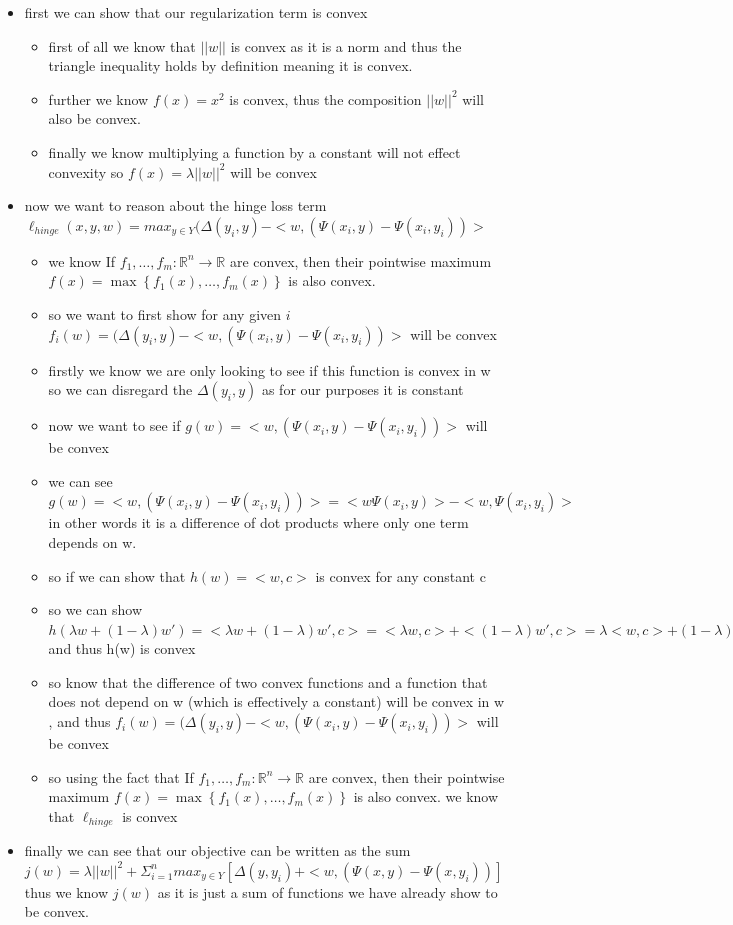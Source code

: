 \documentclass{article}
\theoremstyle{plain}
\theoremstyle{definition}
\begin{document}
\begin{enumerate}
\begin{itemize}
   \color{blue}
    \item first we can show that our regularization term is convex 
    \begin{itemize}
    \item first of all we know that $||w||$ is convex as it is a norm and thus the triangle inequality holds by definition meaning it is convex.
    \item further we know $f(x)=x^2$ is convex, thus the composition $||w||^2$ will also be convex. 
    \item finally we know multiplying a function by a constant will not effect convexity so $f(x)=\lambda||w||^2$ will be convex
    \end{itemize}
    \item now we want to reason about the hinge loss term $\ell_{hinge}(x,y,w)=max_{y\in Y}(\Delta(y_i,y)-<w,(\Psi(x_i,y)- \Psi(x_i,y_i))>$
    \begin{itemize}
        \item we know If $f_{1},\ldots,f_{m}:\mathbb{R}^{n}\to\mathbb{R}$
are convex, then their pointwise maximum $f(x)=\max\left\{ f_{1}(x),\ldots,f_{m}(x)\right\} $
is also convex. 
\item so we want to first show for any given $i$ $f_{i}(w)=(\Delta(y_i,y)-<w,(\Psi(x_i,y)- \Psi(x_i,y_i))>$ will be convex 
\item firstly we know we are only looking to see if this function is convex in w so we can disregard the $\Delta(y_i,y)$ as for our purposes it is constant
\item now we want to see if $g(w)=<w,(\Psi(x_i,y)- \Psi(x_i,y_i))>$ will be convex
\item we can see  $g(w)=<w,(\Psi(x_i,y)- \Psi(x_i,y_i))>=<w\Psi(x_i,y)>-<w,\Psi(x_i,y_i)>$ in other words it is a difference  of dot products where only one term depends on w.
\item so if we can show that $h(w)=<w,c>$ is convex for any constant c
\item so we can show $h(\lambda w+(1-\lambda) w')=<\lambda w+(1-\lambda) w',c>=<\lambda w,c>+<(1-\lambda) w',c>=\lambda< w,c>+(1-\lambda) <w',c>=\lambda h(w)+(1-\lambda)h(w')$ and thus h(w) is convex 
\item so know that the difference of two convex functions and a function that does not depend on w (which is effectively a constant) will be convex in w , and thus $f_{i}(w)=(\Delta(y_i,y)-<w,(\Psi(x_i,y)- \Psi(x_i,y_i))>$ will be convex 
\item so using the fact that If $f_{1},\ldots,f_{m}:\mathbb{R}^{n}\to\mathbb{R}$
are convex, then their pointwise maximum $f(x)=\max\left\{ f_{1}(x),\ldots,f_{m}(x)\right\} $
is also convex. we know that $\ell_{hinge}$ is convex
    \end{itemize}
\item finally we can see that our objective can be written as the sum $j(w)=\lambda ||w||^2+\Sigma_{i=1}^{n}max_{y\in Y}[\Delta(y,y_i)+<w,(\Psi(x,y)-\Psi(x,y_i))]$ thus we know $j(w)$ as it is just a sum of functions we have already show to be convex. 
\end{itemize}



\end{enumerate}
\end{document}
